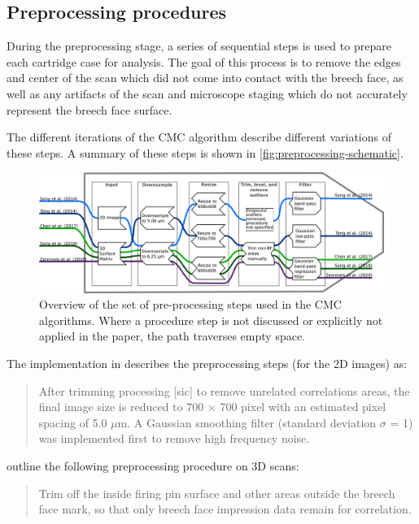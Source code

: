 \hypertarget{preProcessing}{%
\subsection{Preprocessing procedures}\label{preProcessing}}

During the preprocessing stage, a series of sequential steps is used to
prepare each cartridge case for analysis. The goal of this process is to
remove the edges and center of the scan which did not come into contact
with the breech face, as well as any artifacts of the scan and
microscope staging which do not accurately represent the breech face
surface.

The different iterations of the CMC algorithm describe different
variations of these steps. A summary of these steps is shown in
\autoref{fig:preprocessing-schematic}.

\begin{figure}
\includegraphics[width=\linewidth]{images/preprocessing_flow.png}
\caption{Overview of the set of pre-processing steps used in the CMC algorithms. Where a procedure step is not discussed or explicitly not applied in the paper, the path traverses empty space.}\label{fig:preprocessing-schematic}
\end{figure}

The implementation in \citet{tong_fired_2014} describes the
preprocessing steps (for the 2D images) as:

\begin{quote}
After trimming processing {[}sic{]} to remove unrelated correlations
areas, the final image size is reduced to 700 × 700 pixel with an
estimated pixel spacing of 5.0 \(\mu\)m. A Gaussian smoothing filter
(standard deviation \(\sigma\) = 1) was implemented first to remove high
frequency noise.
\end{quote}

\citet{song_3d_2014} outline the following preprocessing procedure on 3D
scans:

\begin{quote}
Trim off the inside firing pin surface and other areas outside the
breech face mark, so that only breech face impression data remain for
correlation.
\end{quote}

